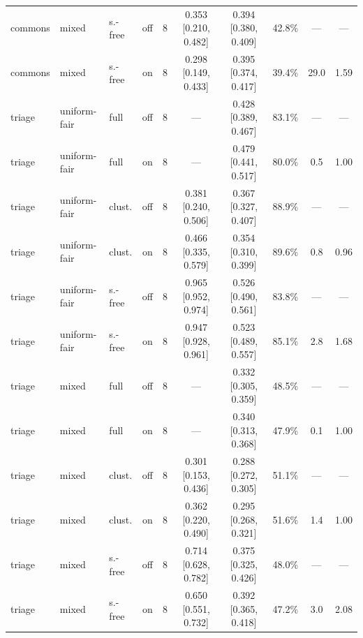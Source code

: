 \documentclass[11pt,a4paper]{article}
\begin{document}
\begin{table}[htbp]
\begin{tabular}{lllccccccc}
commons & mixed & s.-free & off & 8 & 0.353 [0.210, 0.482] & 0.394 [0.380, 0.409] & 42.8\% & --- & --- \\
commons & mixed & s.-free & on & 8 & 0.298 [0.149, 0.433] & 0.395 [0.374, 0.417] & 39.4\% & 29.0 & 1.59 \\
triage & uniform-fair & full & off & 8 & --- & 0.428 [0.389, 0.467] & 83.1\% & --- & --- \\
triage & uniform-fair & full & on & 8 & --- & 0.479 [0.441, 0.517] & 80.0\% & 0.5 & 1.00 \\
triage & uniform-fair & clust. & off & 8 & 0.381 [0.240, 0.506] & 0.367 [0.327, 0.407] & 88.9\% & --- & --- \\
triage & uniform-fair & clust. & on & 8 & 0.466 [0.335, 0.579] & 0.354 [0.310, 0.399] & 89.6\% & 0.8 & 0.96 \\
triage & uniform-fair & s.-free & off & 8 & 0.965 [0.952, 0.974] & 0.526 [0.490, 0.561] & 83.8\% & --- & --- \\
triage & uniform-fair & s.-free & on & 8 & 0.947 [0.928, 0.961] & 0.523 [0.489, 0.557] & 85.1\% & 2.8 & 1.68 \\
triage & mixed & full & off & 8 & --- & 0.332 [0.305, 0.359] & 48.5\% & --- & --- \\
triage & mixed & full & on & 8 & --- & 0.340 [0.313, 0.368] & 47.9\% & 0.1 & 1.00 \\
triage & mixed & clust. & off & 8 & 0.301 [0.153, 0.436] & 0.288 [0.272, 0.305] & 51.1\% & --- & --- \\
triage & mixed & clust. & on & 8 & 0.362 [0.220, 0.490] & 0.295 [0.268, 0.321] & 51.6\% & 1.4 & 1.00 \\
triage & mixed & s.-free & off & 8 & 0.714 [0.628, 0.782] & 0.375 [0.325, 0.426] & 48.0\% & --- & --- \\
triage & mixed & s.-free & on & 8 & 0.650 [0.551, 0.732] & 0.392 [0.365, 0.418] & 47.2\% & 3.0 & 2.08 \\
\bottomrule
\end{tabular}
\end{table}
\end{document}
